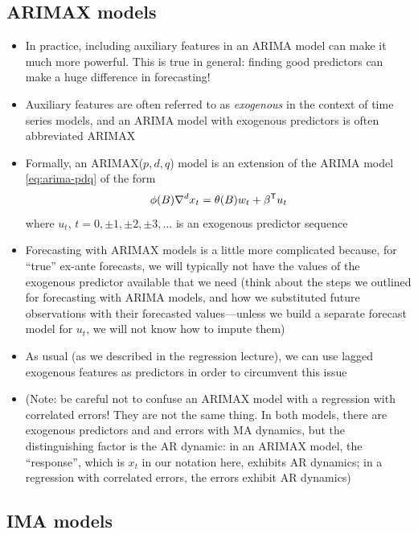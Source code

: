 \documentclass{article}
\begin{document}
\subsection{ARIMAX models}

\begin{itemize}
\item In practice, including auxiliary features in an ARIMA model can make it
  much more powerful. This is true in general: finding good predictors can make
  a huge difference in forecasting!

\item Auxiliary features are often referred to as \emph{exogenous} in the
  context of time series models, and an ARIMA model with exogenous predictors is
  often abbreviated ARIMAX 

\item Formally, an ARIMAX($p,d,q$) model is an extension of the ARIMA model 
  \eqref{eq:arima-pdq} of the form 
  \[
  \phi(B) \nabla^d x_t = \theta(B) w_t + \beta^{\mathsf{T}} u_t
  \]
  where $u_t$, $t = 0, \pm 1, \pm 2, \pm 3, \dots$ is an exogenous predictor
  sequence 

\item Forecasting with ARIMAX models is a little more complicated because, for
  ``true'' ex-ante forecasts, we will typically not have the values of the
  exogenous predictor available that we need (think about the steps we outlined
  for forecasting with ARIMA models, and how we substituted future observations
  with their forecasted values---unless we build a separate forecast model for
  $u_t$, we will not know how to impute them) 

\item As usual (as we described in the regression lecture), we can use lagged
  exogenous features as predictors in order to circumvent this issue

\item (Note: be careful not to confuse an ARIMAX model with a regression with 
  correlated errors! They are not the same thing. In both models, there are
  exogenous predictors and and errors with MA dynamics, but the distinguishing  
  factor is the AR dynamic: in an ARIMAX model, the ``response'', which is $x_t$
  in our notation here, exhibits AR dynamics; in a regression with correlated
  errors, the errors exhibit AR dynamics) 
\end{itemize}

\subsection{IMA models}
\end{document}
